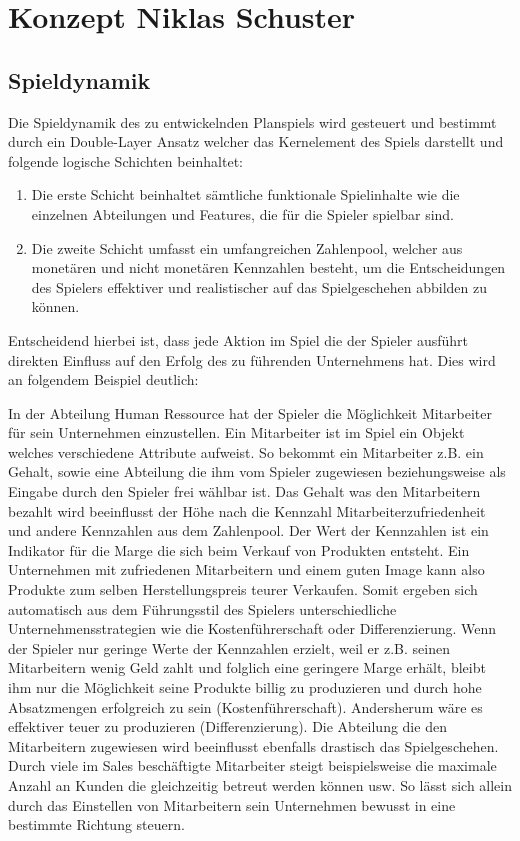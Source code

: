 \section{Konzept \textnormal{\textsf{\small{Niklas Schuster}}}}
\subsection{Spieldynamik}
Die Spieldynamik des zu entwickelnden Planspiels wird gesteuert und bestimmt durch ein Double-Layer Ansatz welcher das Kernelement des Spiels darstellt und folgende logische Schichten beinhaltet:
\begin{enumerate}
\item Die erste Schicht beinhaltet sämtliche funktionale Spielinhalte wie die einzelnen Abteilungen und Features, die für die Spieler spielbar sind.
\item Die zweite Schicht umfasst ein umfangreichen Zahlenpool, welcher aus monetären und nicht monetären Kennzahlen besteht, um die Entscheidungen des Spielers effektiver und realistischer auf das Spielgeschehen abbilden zu können.
\end{enumerate}
Entscheidend hierbei ist, dass jede Aktion im Spiel die der Spieler ausführt direkten Einfluss auf den Erfolg des zu führenden Unternehmens hat. Dies wird an folgendem Beispiel deutlich:
\par In der Abteilung Human Ressource hat der Spieler die Möglichkeit Mitarbeiter für sein Unternehmen einzustellen. Ein Mitarbeiter ist im Spiel ein Objekt welches verschiedene Attribute aufweist. So bekommt ein Mitarbeiter z.B. ein Gehalt, sowie eine Abteilung die ihm vom Spieler zugewiesen beziehungsweise als Eingabe durch den Spieler frei wählbar ist. Das Gehalt was den Mitarbeitern bezahlt wird beeinflusst der Höhe nach die Kennzahl Mitarbeiterzufriedenheit und andere Kennzahlen aus dem Zahlenpool. Der Wert der Kennzahlen ist ein Indikator für die Marge die sich beim Verkauf von Produkten entsteht. Ein Unternehmen mit zufriedenen Mitarbeitern und einem guten Image kann also Produkte zum selben Herstellungspreis teurer Verkaufen. Somit ergeben sich automatisch aus dem Führungsstil des Spielers unterschiedliche Unternehmensstrategien wie die Kostenführerschaft oder Differenzierung. Wenn der Spieler nur geringe Werte der Kennzahlen erzielt, weil er z.B. seinen Mitarbeitern wenig Geld zahlt und folglich eine geringere Marge erhält, bleibt ihm nur die Möglichkeit seine Produkte billig zu produzieren und durch hohe Absatzmengen erfolgreich zu sein (Kostenführerschaft). Andersherum wäre es effektiver teuer zu produzieren (Differenzierung). Die Abteilung die den Mitarbeitern zugewiesen wird beeinflusst ebenfalls drastisch das Spielgeschehen. Durch viele im Sales beschäftigte Mitarbeiter steigt beispielsweise die maximale Anzahl an Kunden die gleichzeitig betreut werden können usw. So lässt sich allein durch das Einstellen von Mitarbeitern sein Unternehmen bewusst in eine bestimmte Richtung steuern.
